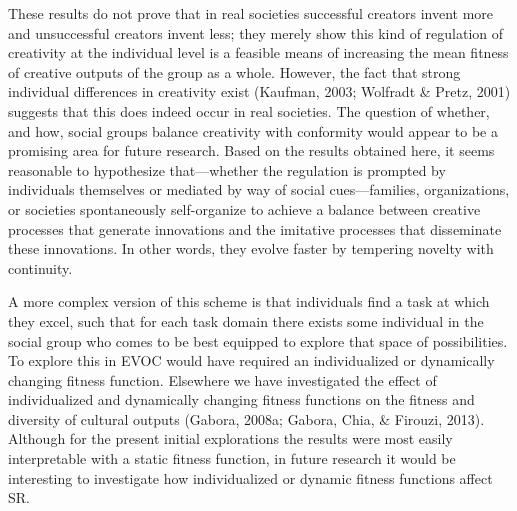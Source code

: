 \documentclass[a4paper,12pt,man,british]{apa6}
\begin{document}
These results do not prove that in real societies successful creators invent more and unsuccessful creators invent less; they merely show this kind of regulation of creativity at the individual level is a feasible means of increasing the mean fitness of creative outputs of the group as a whole. However, the fact that strong individual differences in creativity exist (Kaufman, 2003; Wolfradt \& Pretz, 2001) suggests that this does indeed occur in real societies. The question of whether, and how, social groups balance creativity with conformity would appear to be a promising area for future research. Based on the results obtained here, it seems reasonable to hypothesize that---whether the regulation is prompted by individuals themselves or mediated by way of social cues---families, organizations, or societies spontaneously self-organize to achieve a balance between creative processes that generate innovations and the imitative processes that disseminate these innovations. In other words, they evolve faster by tempering novelty with continuity. 

A more complex version of this scheme is that individuals find a task at which they excel, such that for each task domain there exists some individual in the social group who comes to be best equipped to explore that space of possibilities. To explore this in EVOC would have required an individualized or dynamically changing fitness function. Elsewhere we have investigated the effect of individualized and dynamically changing fitness functions on the fitness and diversity of cultural outputs (Gabora, 2008a; Gabora, Chia, \& Firouzi, 2013). Although for the present initial explorations the results were most easily interpretable with a static fitness function, in future research it would be interesting to investigate how individualized or dynamic fitness functions affect SR.
\end{document}
